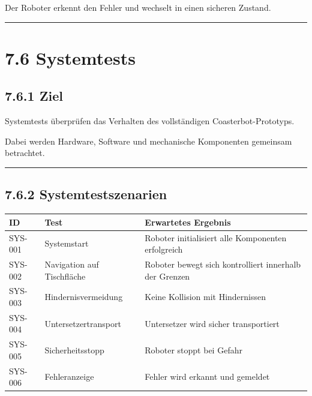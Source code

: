 \documentclass[
]{article}
\begin{document}
Der Roboter erkennt den Fehler und wechselt in einen sicheren Zustand.

\begin{center}\rule{0.5\linewidth}{0.5pt}\end{center}

\section{7.6 Systemtests}\label{systemtests-1}

\subsection{7.6.1 Ziel}\label{ziel-3}

Systemtests überprüfen das Verhalten des vollständigen
Coasterbot-Prototyps.

Dabei werden Hardware, Software und mechanische Komponenten gemeinsam
betrachtet.

\begin{center}\rule{0.5\linewidth}{0.5pt}\end{center}

\subsection{7.6.2 Systemtestszenarien}\label{systemtestszenarien}

\begin{longtable}[]{@{}
  >{\raggedright\arraybackslash}p{}
  >{\raggedright\arraybackslash}p{}
  >{\raggedright\arraybackslash}p{}@{}}
\toprule\noalign{}
\begin{minipage}[b]{\linewidth}\raggedright
ID
\end{minipage} & \begin{minipage}[b]{\linewidth}\raggedright
Test
\end{minipage} & \begin{minipage}[b]{\linewidth}\raggedright
Erwartetes Ergebnis
\end{minipage} \\
\midrule\noalign{}
\endhead
\bottomrule\noalign{}
\endlastfoot
SYS-001 & Systemstart & Roboter initialisiert alle Komponenten
erfolgreich \\
SYS-002 & Navigation auf Tischfläche & Roboter bewegt sich kontrolliert
innerhalb der Grenzen \\
SYS-003 & Hindernisvermeidung & Keine Kollision mit Hindernissen \\
SYS-004 & Untersetzertransport & Untersetzer wird sicher
transportiert \\
SYS-005 & Sicherheitsstopp & Roboter stoppt bei Gefahr \\
SYS-006 & Fehleranzeige & Fehler wird erkannt und gemeldet \\
\end{longtable}
\end{document}
